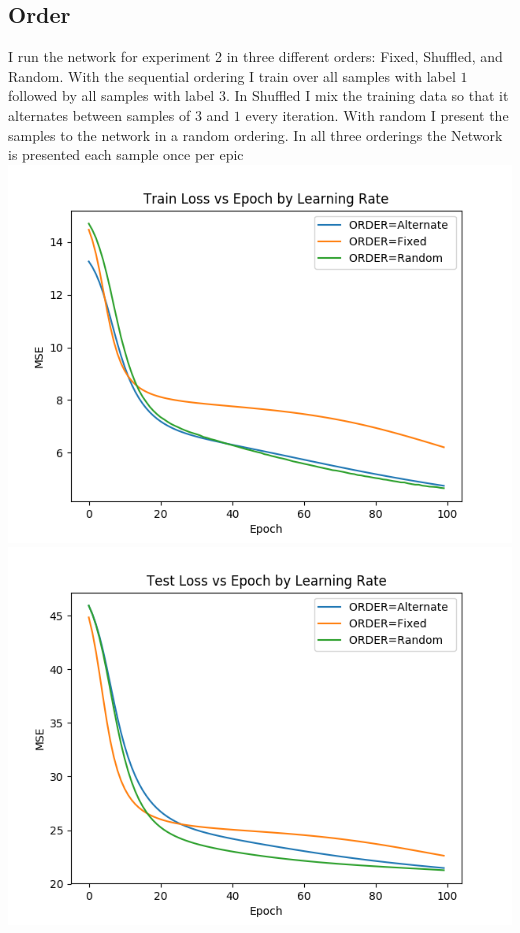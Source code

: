 \documentclass{article}
\begin{document}
\subsection{Order}
I run the network for experiment 2 in three different orders: Fixed, Shuffled, and Random.  With the sequential ordering I train over all samples with label $1$ followed by all samples with label $3$.  In Shuffled I mix the training data so that it alternates between samples of $3$ and $1$ every iteration.  With random I present the samples to the network in a random ordering.  In all three orderings the Network is presented each sample once per epic
\includegraphics[scale=.5]{Pictures/part2/OrderTrainLoss}
\includegraphics[scale=.5]{Pictures/part2/OrderTestLoss}
\end{document}
